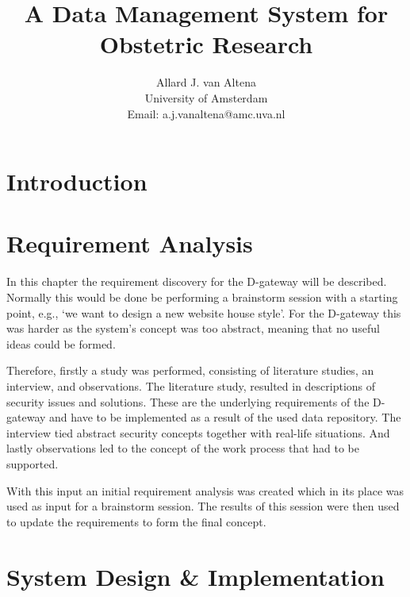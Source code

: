 \documentclass[a4paper]{report}
\title{A Data Management System for Obstetric Research}
\author{
	Allard J. van Altena\\
	University of Amsterdam\\
	Email: a.j.vanaltena@amc.uva.nl
}
\newcommand{\eg}{e.g.,}
\newcommand{\ivfsystem}{D-gateway}
\begin{document}
	
	\tableofcontents
	
	\chapter{Introduction}
	\label{introduction}
	
	
	
	
	
	\chapter{Requirement Analysis}
	\label{requirements}
	
	In this chapter the requirement discovery for the \ivfsystem{} will be described.
	Normally this would be done be performing a brainstorm session with a starting point, \eg{} `we want to design a new website house style'.
	For the \ivfsystem{} this was harder as the system's concept was too abstract, meaning that no useful ideas could be formed.
	
	Therefore, firstly a study was performed, consisting of literature studies, an interview, and observations.
	The literature study, resulted in descriptions of security issues and solutions.
	These are the underlying requirements of the \ivfsystem{} and have to be implemented as a result of the used data repository.
	The interview tied abstract security concepts together with real-life situations.
	And lastly observations led to the concept of the work process that had to be supported. 
	
	With this input an initial requirement analysis was created which in its place was used as input for a brainstorm session.
	The results of this session were then used to update the requirements to form the final concept.
	
	
	
	
	
	
	
	
	
	\chapter{System Design \& Implementation}
	\label{system-functionality}
	
\end{document}
